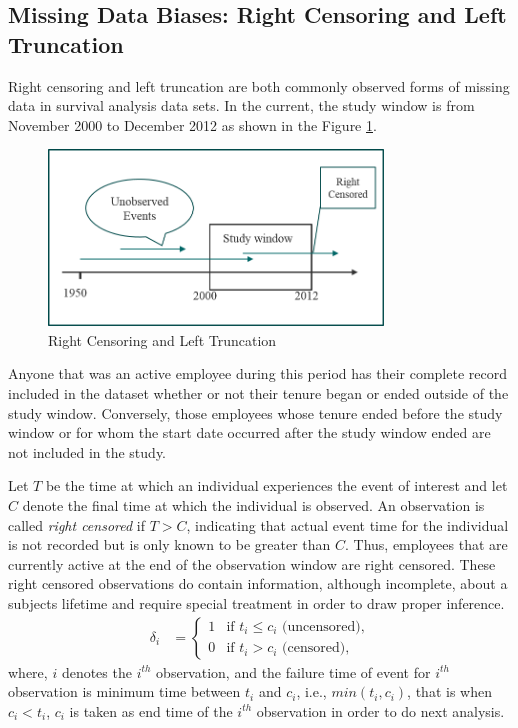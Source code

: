 \documentclass[12pt,letterpaper]{article}
\begin{document}
 \subsection{Missing Data Biases: Right Censoring and Left Truncation}\label{bias}
 Right censoring and left truncation are both commonly observed forms of missing data in survival analysis data sets. In the current, the study window is from November 2000 to December 2012 as shown in the Figure \ref{fig:1}.
 \begin{figure}[htbp]
 	\centering
 	\includegraphics[width=3.5in]{fig1.png}
 	\caption{Right Censoring and Left Truncation}
 	\label{fig:1}
 \end{figure}
 Anyone that was an active employee during this period has their complete record included in the dataset whether or not their tenure began or ended outside of the study window.  Conversely, those employees whose tenure ended before the study window or for whom the start date occurred after the study window ended are not included in the study.

 Let $T$ be the time at which  an individual experiences the event of interest and let $C$ denote the final time at which the individual is observed. An observation is called {\it right censored} if $T> C$, indicating that actual event time for the individual is not recorded but is only known to be greater than $C$. Thus, employees that are currently active at the end of the observation window are right censored. These right censored observations do contain information, although incomplete, about a subjects lifetime and require special treatment in order to draw proper inference.
 \begin{align*}
 \delta_i&=
 \begin{cases}
 1   &\text{if  }  t_i \leq c_i \text{ (uncensored),}\\
 0   &\text{if  }  t_i > c_i \text{ (censored),}
 \end{cases}
 \end{align*}
 where, $i$ denotes the $i^{th}$ observation, and the failure time of event for $i^{th}$ observation is minimum time between $t_i$ and $c_i$, i.e., $min(t_i, c_i)$, that is when $c_i <t_i $, $c_i$ is taken as end time of the $i^{th}$ observation in order to do next  analysis.
\end{document}
